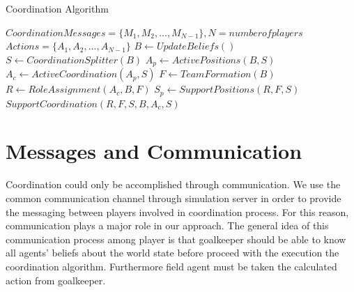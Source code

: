 \begin{algorithm}[ht!]
\caption{Coordination Algorithm }
\label{CoordinationAlgorithm}
\begin{algorithmic}[1]
$Coordination Messages = \lbrace M_{1},M_{2},...,M_{N-1} \rbrace, N = number of players $
$Actions = \lbrace A_{1},A_{2},...,A_{N-1} \rbrace$
\STATE $B \leftarrow Update Beliefs() $
\STATE $S \leftarrow Coordination Splitter(B) $
\STATE $A_{p} \leftarrow Active Positions(B,S) $
\STATE $A_{c} \leftarrow Active Coordination(A_{p},S) $
\STATE $ F \leftarrow TeamFormation(B) $
\STATE $ R \leftarrow Role Assignment(A_{c},B,F) $
\STATE $ S_{p} \leftarrow Support Positions(R,F,S) $
\STATE $ Support Coordination(R,F,S,B,A_{c},S) $
\ENDIF
\end{algorithmic}
\end{algorithm}


\section{Messages and Communication}
Coordination could only be accomplished through communication. We use the common communication channel through simulation server in order to provide the messaging between players involved in coordination process. For this reason, communication plays a major role in our approach. The general idea of this communication process among player is that goalkeeper should be able to know all agents' beliefs about the world state before proceed with the execution the coordination algorithm. Furthermore field agent must be taken the calculated action from goalkeeper. 

